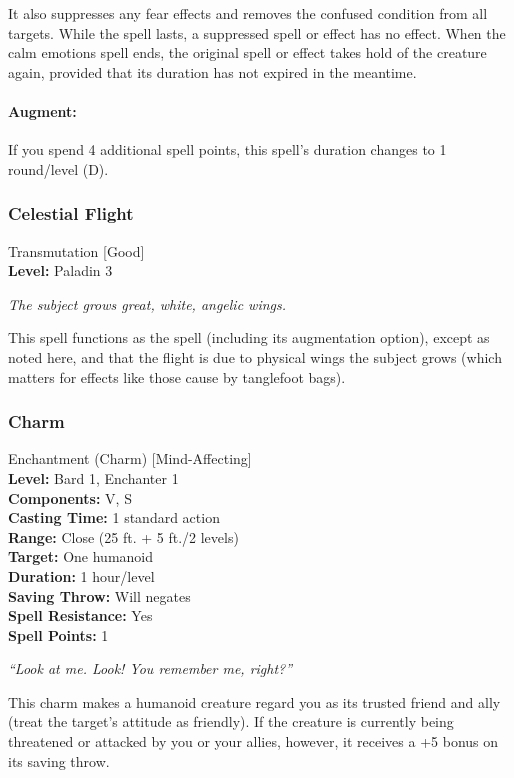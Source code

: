 It also suppresses any fear effects and removes the confused condition from all targets. 
While the spell lasts, a suppressed spell or effect has no effect. 
When the calm emotions spell ends, the original spell or effect takes hold of the creature again, provided that its duration has not expired in the meantime.

\paragraph{Augment:} If you spend 4 additional spell points, this spell's duration changes to 1 round/level (D).
\subsubsection{Celestial Flight}
\label{Spell:CelestialFlight}
Transmutation [Good]
\\ \textbf{Level:} Paladin 3

\emph{The subject grows great, white, angelic wings.}

This spell functions as the  spell (including its augmentation option), except as noted here, and that the flight is due to physical wings the subject grows (which matters for effects like those cause by tanglefoot bags).
\subsubsection{Charm}
\label{Spell:Charm}
Enchantment (Charm) [Mind-Affecting]
\\ \textbf{Level:} Bard 1, Enchanter 1
\\ \textbf{Components:} V, S
\\ \textbf{Casting Time:} 1 standard action
\\ \textbf{Range:} Close (25 ft. + 5 ft./2 levels)
\\ \textbf{Target:} One humanoid
\\ \textbf{Duration:} 1 hour/level
\\ \textbf{Saving Throw:} Will negates
\\ \textbf{Spell Resistance:} Yes
\\ \textbf{Spell Points:} 1

\emph{``Look at me. Look! You remember me, right?''}

This charm makes a humanoid creature regard you as its trusted friend and ally (treat the target's attitude as friendly). 
If the creature is currently being threatened or attacked by you or your allies, however, it receives a +5 bonus on its saving throw.

